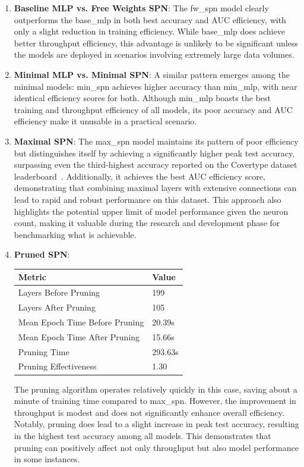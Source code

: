 \begin{enumerate}
\item \textbf{Baseline MLP vs. Free Weights SPN}: The fw\_spn model clearly outperforms the base\_mlp in both best accuracy and AUC efficiency, with only a slight reduction in training efficiency. While base\_mlp does achieve better throughput efficiency, this advantage is unlikely to be significant unless the models are deployed in scenarios involving extremely large data volumes.
\item \textbf{Minimal MLP vs. Minimal SPN}: A similar pattern emerges among the minimal models: min\_spn achieves higher accuracy than min\_mlp, with near identical efficiency scores for both. Although min\_mlp boasts the best training and throughput efficiency of all models, its poor accuracy and AUC efficiency make it unusable in a practical scenario.
\item \textbf{Maximal SPN}: The max\_spn model maintains its pattern of poor efficiency but distinguishes itself by achieving a significantly higher peak test accuracy, surpassing even the third-highest accuracy reported on the Covertype dataset leaderboard~\cite{kaggle_covertype_leaderboard}. Additionally, it achieves the best AUC efficiency score, demonstrating that combining maximal layers with extensive connections can lead to rapid and robust performance on this dataset. This approach also highlights the potential upper limit of model performance given the neuron count, making it valuable during the research and development phase for benchmarking what is achievable.
\item \textbf{Pruned SPN}:
\begin{center}  %
\begin{tabular}{|l|l|}
\hline
\textbf{Metric} & \textbf{Value} \\
\hline
Layers Before Pruning & 199 \\
Layers After Pruning & 105 \\
Mean Epoch Time Before Pruning & 20.39s \\
Mean Epoch Time After Pruning & 15.66s \\
Pruning Time & 293.63s \\
Pruning Effectiveness & 1.30 \\
\hline
\end{tabular}
\end{center}

The pruning algorithm operates relatively quickly in this case, saving about a minute of training time compared to max\_spn. However, the improvement in throughput is modest and does not significantly enhance overall efficiency. Notably, pruning does lead to a slight increase in peak test accuracy, resulting in the highest test accuracy among all models. This demonstrates that pruning can positively affect not only throughput but also model performance in some instances.

\end{enumerate}

